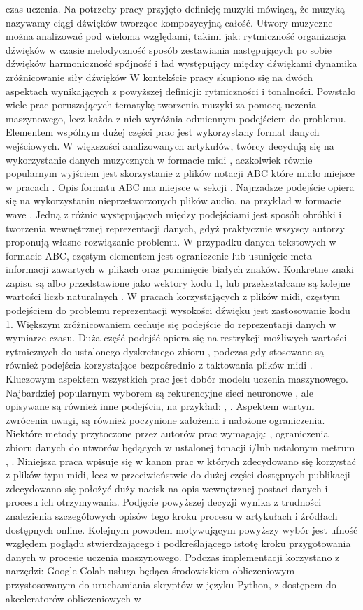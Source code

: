 czas uczenia.             Na potrzeby pracy przyjęto definicję muzyki mówiącą, że muzyką nazywamy ciągi  dźwięków tworzące kompozycyjną całość.  Utwory muzyczne można analizować pod wieloma względami, takimi jak:  rytmiczność  organizacja dźwięków w czasie  melodyczność  sposób zestawiania następujących po sobie dźwięków   harmoniczność  spójność i ład występujący między dźwiękami  dynamika  zróżnicowanie siły dźwięków W kontekście pracy skupiono się na dwóch aspektach wynikających z powyższej  definicji: rytmiczności i tonalności.          Powstało wiele prac poruszających tematykę tworzenia muzyki za pomocą uczenia maszynowego,  lecz każda z nich wyróżnia odmiennym podejściem do problemu. Elementem wspólnym dużej części prac jest wykorzystany format danych wejściowych. W większości analizowanych artykułów, twórcy decydują się na wykorzystanie  danych muzycznych w formacie midi ,  aczkolwiek równie popularnym wyjściem jest skorzystanie z plików notacji ABC które miało miejsce w pracach .  Opis formatu ABC ma miejsce w sekcji . Najrzadsze podejście opiera się na wykorzystaniu nieprzetworzonych plików audio,  na przykład w formacie wave . Jedną z różnic występujących między podejściami jest sposób obróbki i tworzenia wewnętrznej reprezentacji danych, gdyż praktycznie wszyscy autorzy  proponują własne rozwiązanie problemu.  W przypadku danych tekstowych w formacie ABC, częstym elementem jest ograniczenie lub usunięcie meta informacji zawartych w plikach  oraz pominięcie białych znaków. Konkretne znaki zapisu są albo przedstawione jako wektory kodu  1,  lub przekształcane są kolejne wartości liczb naturalnych . W pracach korzystających z plików midi, częstym podejściem do problemu reprezentacji wysokości dźwięku jest zastosowanie kodu  1. Większym zróżnicowaniem cechuje się podejście do reprezentacji danych w wymiarze czasu. Duża część podejść opiera się na restrykcji możliwych wartości rytmicznych do ustalonego dyskretnego zbioru ,  podczas gdy stosowane są również podejścia korzystające bezpośrednio z taktowania  plików midi . Kluczowym aspektem wszystkich prac jest dobór modelu uczenia maszynowego. Najbardziej popularnym wyborem są rekurencyjne sieci neuronowe , ale opisywane są również inne podejścia, na przykład:      ,      . Aspektem wartym zwrócenia uwagi, są również poczynione założenia i nałożone ograniczenia. Niektóre metody przytoczone przez autorów prac wymagają:      ,    ograniczenia zbioru danych do utworów będących w    ustalonej tonacji i/lub ustalonym metrum ,   .          Niniejsza praca wpisuje się w kanon prac w których zdecydowano się korzystać z plików typu midi, lecz w przeciwieństwie do dużej części dostępnych publikacji zdecydowano się położyć duży nacisk na opis wewnętrznej postaci danych i procesu ich otrzymywania.  Podjęcie powyższej decyzji wynika z trudności znalezienia szczegółowych opisów tego kroku  procesu w artykułach i źródłach dostępnych online.  Kolejnym powodem motywującym powyższy wybór jest ufność względem poglądu stwierdzającego i  podkreślającego istotę kroku przygotowania danych w procesie uczenia maszynowego.             Podczas implementacji korzystano z narzędzi:       Google Colab  usługa będąca środowiskiem obliczeniowym przystosowanym    do uruchamiania skryptów w języku Python, z dostępem do akceleratorów obliczeniowych   w 